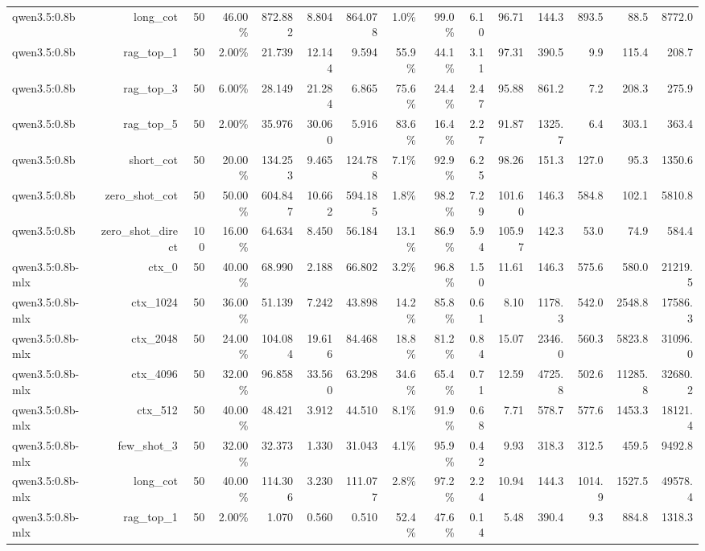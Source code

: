 \begin{table}[t]
\begin{tabular}{lrrrrrrrrrrrrrr}
qwen3.5:0.8b & long\_cot & 50 & 46.00\% & 872.882 & 8.804 & 864.078 & 1.0\% & 99.0\% & 6.10 & 96.71 & 144.3 & 893.5 & 88.5 & 8772.0 \\
qwen3.5:0.8b & rag\_top\_1 & 50 & 2.00\% & 21.739 & 12.144 & 9.594 & 55.9\% & 44.1\% & 3.11 & 97.31 & 390.5 & 9.9 & 115.4 & 208.7 \\
qwen3.5:0.8b & rag\_top\_3 & 50 & 6.00\% & 28.149 & 21.284 & 6.865 & 75.6\% & 24.4\% & 2.47 & 95.88 & 861.2 & 7.2 & 208.3 & 275.9 \\
qwen3.5:0.8b & rag\_top\_5 & 50 & 2.00\% & 35.976 & 30.060 & 5.916 & 83.6\% & 16.4\% & 2.27 & 91.87 & 1325.7 & 6.4 & 303.1 & 363.4 \\
qwen3.5:0.8b & short\_cot & 50 & 20.00\% & 134.253 & 9.465 & 124.788 & 7.1\% & 92.9\% & 6.25 & 98.26 & 151.3 & 127.0 & 95.3 & 1350.6 \\
qwen3.5:0.8b & zero\_shot\_cot & 50 & 50.00\% & 604.847 & 10.662 & 594.185 & 1.8\% & 98.2\% & 7.29 & 101.60 & 146.3 & 584.8 & 102.1 & 5810.8 \\
qwen3.5:0.8b & zero\_shot\_direct & 100 & 16.00\% & 64.634 & 8.450 & 56.184 & 13.1\% & 86.9\% & 5.94 & 105.97 & 142.3 & 53.0 & 74.9 & 584.4 \\
qwen3.5:0.8b-mlx & ctx\_0 & 50 & 40.00\% & 68.990 & 2.188 & 66.802 & 3.2\% & 96.8\% & 1.50 & 11.61 & 146.3 & 575.6 & 580.0 & 21219.5 \\
qwen3.5:0.8b-mlx & ctx\_1024 & 50 & 36.00\% & 51.139 & 7.242 & 43.898 & 14.2\% & 85.8\% & 0.61 & 8.10 & 1178.3 & 542.0 & 2548.8 & 17586.3 \\
qwen3.5:0.8b-mlx & ctx\_2048 & 50 & 24.00\% & 104.084 & 19.616 & 84.468 & 18.8\% & 81.2\% & 0.84 & 15.07 & 2346.0 & 560.3 & 5823.8 & 31096.0 \\
qwen3.5:0.8b-mlx & ctx\_4096 & 50 & 32.00\% & 96.858 & 33.560 & 63.298 & 34.6\% & 65.4\% & 0.71 & 12.59 & 4725.8 & 502.6 & 11285.8 & 32680.2 \\
qwen3.5:0.8b-mlx & ctx\_512 & 50 & 40.00\% & 48.421 & 3.912 & 44.510 & 8.1\% & 91.9\% & 0.68 & 7.71 & 578.7 & 577.6 & 1453.3 & 18121.4 \\
qwen3.5:0.8b-mlx & few\_shot\_3 & 50 & 32.00\% & 32.373 & 1.330 & 31.043 & 4.1\% & 95.9\% & 0.42 & 9.93 & 318.3 & 312.5 & 459.5 & 9492.8 \\
qwen3.5:0.8b-mlx & long\_cot & 50 & 40.00\% & 114.306 & 3.230 & 111.077 & 2.8\% & 97.2\% & 2.24 & 10.94 & 144.3 & 1014.9 & 1527.5 & 49578.4 \\
qwen3.5:0.8b-mlx & rag\_top\_1 & 50 & 2.00\% & 1.070 & 0.560 & 0.510 & 52.4\% & 47.6\% & 0.14 & 5.48 & 390.4 & 9.3 & 884.8 & 1318.3 \\

\end{tabular}
\end{table}
